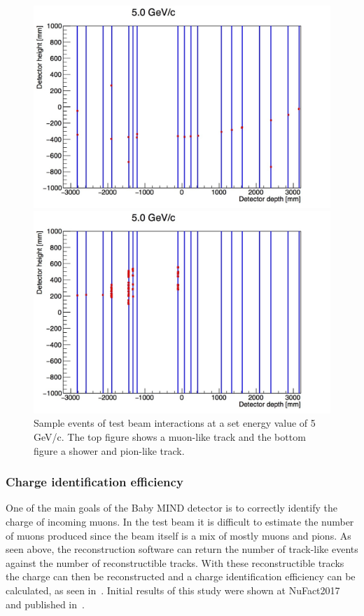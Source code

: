 \begin{figure}[h!]
\centering
\includegraphics[width=\textwidth]{figures/oldStudies/m5GeVevent2.jpg}

\includegraphics[width=\textwidth]{figures/oldStudies/m5GeVevent3.jpg}
\caption{Sample events of test beam interactions at a set energy value of 5 GeV/c. The top figure shows a muon-like track and the bottom figure a shower and pion-like track.}
\label{fig:EventsInitial}
\end{figure}

\subsubsection{Charge identification efficiency}
One of the main goals of the Baby MIND detector is to correctly identify the charge of incoming muons. In the test beam it is difficult to estimate the number of muons produced since the beam itself is a mix of mostly muons and pions. As seen above, the reconstruction software can return the number of track-like events against the number of reconstructible tracks. With these reconstructible tracks the charge can then be reconstructed and a charge identification efficiency can be calculated, as seen in~. Initial results of this study were shown at NuFact2017 and published in~\cite{82Uppsala}.


